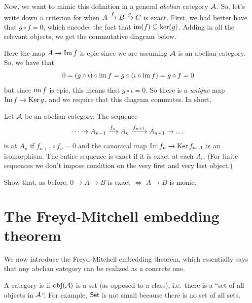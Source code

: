 Now, we want to mimic this definition in a general \emph{abelian} category $\AA$.
So, let's write down a criterion for when $A \taking f B \taking g C$ is exact.
First, we had better have that $g \circ f = 0$,
which encodes the fact that $\img(f) \subseteq \ker(g)$.
Adding in all the relevant objects, we get the commutative diagram below.
\begin{center}
\end{center}
Here the map $A \surjto \Img f$ is epic since we are assuming $\AA$ is an abelian category.
So, we have that
\[ 0 = (g \circ \iota) \circ \img f = g \circ (\iota \circ \img f) = g \circ f = 0 \]
but since $\img f$ is epic, this means that $g \circ \iota = 0$.
So there is a \emph{unique} map $\Img f \to \Ker g$, and we require that this diagram commutes.
In short,
\begin{definition}
	Let $\AA$ be an abelian category. The sequence
	\[ \dots \to A_{n-1} \taking{f_n} A_n \taking{f_{n+1}} A_{n+1} \to \dots \]
	is  at $A_n$ if $f_{n+1} \circ f_n = 0$ and
	the canonical map $\Img f_n \to \Ker f_{n+1}$ is an isomorphism.
	The entire sequence is exact if it is exact at each $A_i$.
	(For finite sequences we don't impose condition on the very first and very last object.)
\end{definition}

\begin{exercise}
	Show that, as before, $0 \to A \to B$ is exact $\iff$ $A \to B$ is monic.
\end{exercise}

\section{The Freyd-Mitchell embedding theorem}
We now introduce the Freyd-Mitchell embedding theorem,
which essentially says that any abelian category can be realized as a concrete one.

\begin{definition}
	A category is  if $\obj(\AA)$ is a set (as opposed to a class),
	i.e.\ there is a ``set of all objects in $\AA$''.
	For example, $\catname{Set}$ is not small because there is no set of all sets.
\end{definition}

